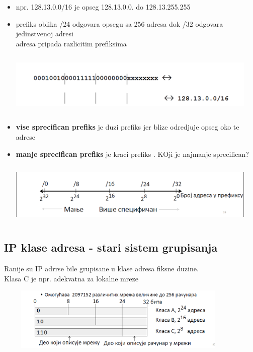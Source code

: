 \documentclass{article} %
\begin{document}
\begin{itemize}
  \item npr. 128.13.0.0/16 je opseg 128.13.0.0. do 128.13.255.255
  \item prefiks oblika /24 odgovara opsegu sa 256 adresa dok /32 odgovara jedinstvenoj adresi\\
 adresa pripada razlicitim prefiksima
 \begin{center}
\includegraphics[width=12cm, height=3cm]{prefiks2}\\
\end{center}
\item \textbf{vise sprecifican prefiks} je duzi prefiks jer blize odredjuje opseg oko te adrese
\item \textbf{manje sprecifican prefiks} je kraci prefiks . KOji je najmanje sprecifican?
\begin{center}
\includegraphics[width=12cm, height=3cm]{prefiks3}\\
\end{center}
\end{itemize}

\subsection{IP klase adresa - stari sistem grupisanja}

 Ranije su IP adrrse bile grupisane u klase adresa fiksne duzine.\\
Klasa C je npr. adekvatna za lokalne mreze 
\begin{center}
\includegraphics[width=12cm, height=3cm]{ranije}\\
\end{center}
\end{document}
